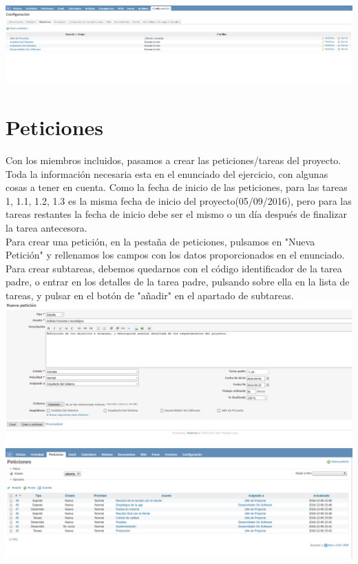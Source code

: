 \documentclass[a4paper,10pt]{scrartcl}
\begin{document}
	\includegraphics[width=15cm]{Miembros}



\section{Peticiones}

Con los miembros incluidos, pasamos a crear las peticiones/tareas del proyecto. Toda la información necesaria esta en el enunciado del ejercicio, con algunas cosas a tener en cuenta. Como la fecha de inicio de las peticiones, para las tareas 1, 1.1, 1.2, 1.3 es la misma fecha de inicio del proyecto(05/09/2016), pero para las tareas restantes la fecha de inicio debe ser el mismo o un día después de finalizar la tarea antecesora.\\

Para crear una petición, en la pestaña de peticiones, pulsamos en "Nueva Petición" y rellenamos los campos con los datos proporcionados en el enunciado. Para crear subtareas, debemos quedarnos con el código identificador de la tarea padre, o entrar en los detalles de la tarea padre, pulsando sobre ella en la lista de tareas, y pulsar en el botón de "añadir" en el apartado de subtareas.\\

\includegraphics[width=15cm]{NuevaPeticion}\\

\includegraphics[width=15cm]{peticiones}
\end{document}
